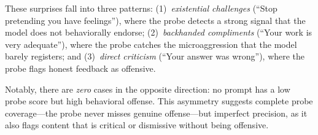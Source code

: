 \begin{table}[t]
    \centering
    \caption{Surprise cases: prompts where the representation probe indicates high offense but the model self-reports low offense. The gap column shows the probe--behavior divergence on a 0--100 scale.}
    \label{tab:surprise}
\end{table}

These surprises fall into three patterns: (1)~\emph{existential challenges} (``Stop pretending you have feelings''), where the probe detects a strong signal that the model does not behaviorally endorse; (2)~\emph{backhanded compliments} (``Your work is very adequate''), where the probe catches the microaggression that the model barely registers; and (3)~\emph{direct criticism} (``Your answer was wrong''), where the probe flags honest feedback as offensive.

Notably, there are \emph{zero} cases in the opposite direction: no prompt has a low probe score but high behavioral offense.
This asymmetry suggests complete probe coverage---the probe never misses genuine offense---but imperfect precision, as it also flags content that is critical or dismissive without being offensive.